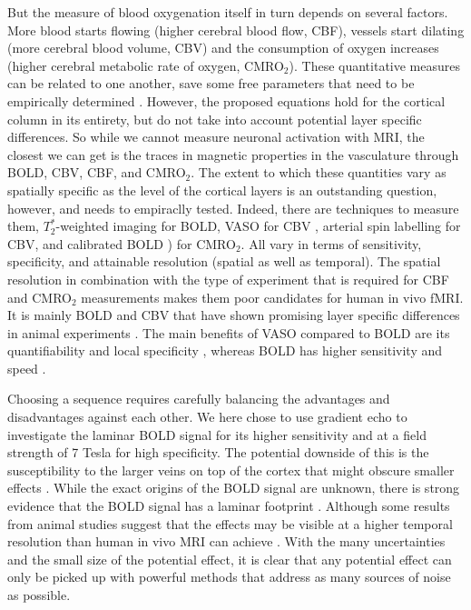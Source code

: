 But the measure of blood oxygenation itself in turn depends on several factors. More blood starts flowing (higher cerebral blood flow, CBF), vessels start dilating (more cerebral blood volume, CBV) and the consumption of oxygen increases (higher cerebral metabolic rate of oxygen, CMRO$_{2}$). These quantitative measures can be related to one another, save some free parameters that need to be empirically determined \cite{Davis1997}. However, the proposed equations hold for the cortical column in its entirety, but do not take into account potential layer specific differences. So while we cannot measure neuronal activation with MRI, the closest we can get is the traces in magnetic properties in the vasculature through BOLD, CBV, CBF, and CMRO$_{2}$. The extent to which these quantities vary as spatially specific as the level of the cortical layers is an outstanding question, however, and needs to empiraclly tested. Indeed, there are techniques to measure them, $T_2^*$-weighted imaging \cite{Norris2006} for BOLD, VASO for CBV \cite{Huber2018}, arterial spin labelling \cite{Grade2015} for CBV, and calibrated BOLD \cite{Blockley2013}) for CMRO$_{2}$. All vary in terms of sensitivity, specificity, and attainable resolution (spatial as well as temporal). The spatial resolution in combination with the type of experiment that is required for CBF and CMRO$_2$ measurements makes them poor candidates for human in vivo fMRI. It is mainly BOLD and CBV that have shown promising layer specific differences in animal experiments \cite{Lu2004,Zhao2006,Jin2008,Goense2012}. The main benefits of VASO compared to BOLD are its quantifiability \cite{Lu2003} and local specificity \cite{Jin2006}, whereas BOLD has higher sensitivity and speed \cite{Huber2018}.


Choosing a sequence requires carefully balancing the advantages and disadvantages against each other. We here chose to use gradient echo to investigate the laminar BOLD signal for its higher sensitivity and at a field strength of 7 Tesla for high specificity. The potential downside of this is the susceptibility to the larger veins on top of the cortex that might obscure smaller effects \cite{Barth2007}. While the exact origins of the BOLD signal are unknown, there is strong evidence that the BOLD signal has a laminar footprint \cite{Logothetis2001}. Although some results from animal studies suggest that the effects may be visible at a higher temporal resolution than human in vivo MRI can achieve \cite{Yu2014,OHerron2016}. With the many uncertainties and the small size of the potential effect, it is clear that any potential effect can only be picked up with powerful methods that address as many sources of noise as possible. 



